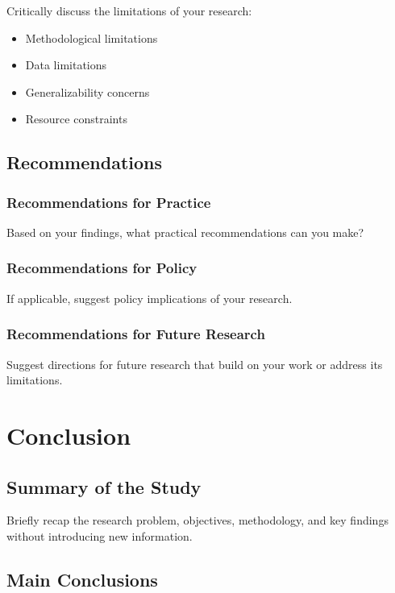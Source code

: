 \documentclass[12pt, a4paper]{report}
\begin{document}
	Critically discuss the limitations of your research:
	\begin{itemize}
		\item Methodological limitations
		\item Data limitations
		\item Generalizability concerns
		\item Resource constraints
	\end{itemize}
	
	\section{Recommendations}
	\label{sec:recommendations}
	
	\subsection{Recommendations for Practice}
	
	Based on your findings, what practical recommendations can you make?
	
	\subsection{Recommendations for Policy}
	
	If applicable, suggest policy implications of your research.
	
	\subsection{Recommendations for Future Research}
	
	Suggest directions for future research that build on your work or address its limitations.
	
	\chapter{Conclusion}
	\label{chap:conclusion}
	
	\section{Summary of the Study}
	
	Briefly recap the research problem, objectives, methodology, and key findings without introducing new information.
	
	\section{Main Conclusions}
	
\end{document}
